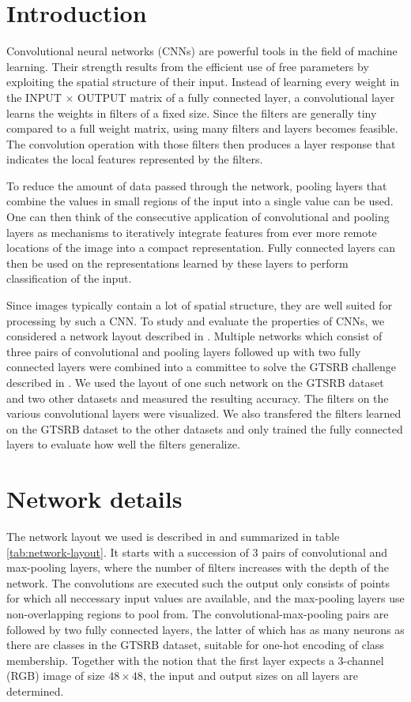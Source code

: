 \documentclass[11pt, a4paper]{article}
\begin{document}
\newpage
\section{Introduction}
Convolutional neural networks (CNNs) are powerful tools in the field of machine learning. Their strength results from the efficient use of free parameters by exploiting the spatial structure of their input. Instead of learning every weight in the INPUT $\times$ OUTPUT matrix of a fully connected layer, a convolutional layer learns the weights in filters of a fixed size. Since the filters are generally tiny compared to a full weight matrix, using many filters and layers becomes feasible. The convolution operation with those filters then produces a layer response that indicates the local features represented by the filters.

To reduce the amount of data passed through the network, pooling layers that combine the values in small regions of the input into a single value can be used. One can then think of the consecutive application of convolutional and pooling layers as mechanisms to iteratively integrate features from ever more remote locations of the image into a compact representation. Fully connected layers can then be used on the representations learned by these layers to perform classification of the input.

Since images typically contain a lot of spatial structure, they are well suited for processing by such a CNN. To study and evaluate the properties of CNNs, we considered a network layout described in \cite{multi-column-neural-network-gtsrb}. Multiple networks which consist of three pairs of convolutional and pooling layers followed up with two fully connected layers were combined into a committee to solve the GTSRB challenge described in \cite{gtsrb}. We used the layout of one such network on the GTSRB dataset and two other datasets and measured the resulting accuracy. The filters on the various convolutional layers were visualized. We also transfered the filters learned on the GTSRB dataset to the other datasets and only trained the fully connected layers to evaluate how well the filters generalize.

\section{Network details}
The network layout we used is described in \cite{multi-column-neural-network-gtsrb} and summarized in table \ref{tab:network-layout}. It starts with a succession of 3 pairs of convolutional and max-pooling layers, where the number of filters increases with the depth of the network. The convolutions are executed such the output only consists of points for which all neccessary input values are available, and the max-pooling layers use non-overlapping regions to pool from. The convolutional-max-pooling pairs are followed by two fully connected layers, the latter of which has as many neurons as there are classes in the GTSRB dataset, suitable for one-hot encoding of class membership. Together with the notion that the first layer expects a 3-channel (RGB) image of size $48\times48$, the input and output sizes on all layers are determined.
\end{document}
